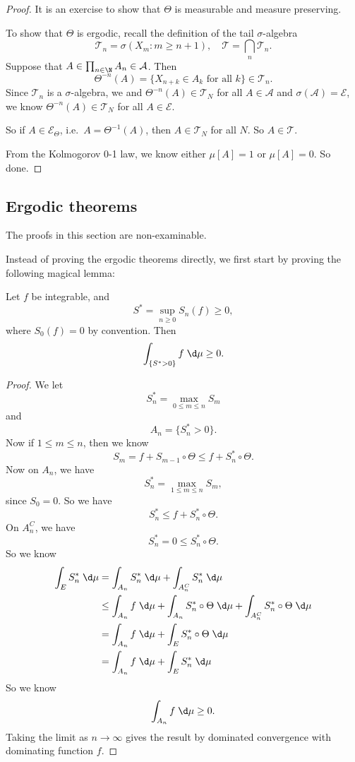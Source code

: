\documentclass[a4paper]{article}
\begin{document}
\begin{proof}
  It is an exercise to show that $\Theta$ is measurable and measure preserving.

  To show that $\Theta$ is ergodic, recall the definition of the tail $\sigma$-algebra
  \[
    \mathcal{T}_n = \sigma(X_m: m \geq n + 1),\quad \mathcal{T} = \bigcap_n \mathcal{T}_n.
  \]
  Suppose that $A \in \prod_{n \in \N} A_n \in \mathcal{A}$. Then
  \[
    \Theta^{-n}(A) = \{X_{n + k} \in A_k \text{ for all }k\} \in \mathcal{T}_n.
  \]
  Since $\mathcal{T}_n$ is a $\sigma$-algebra, we and $\Theta^{-n}(A) \in \mathcal{T}_N$ for all $A \in \mathcal{A}$ and $\sigma(\mathcal{A}) = \mathcal{E}$, we know $\Theta^{-n}(A) \in \mathcal{T}_N$ for all $A \in \mathcal{E}$.

  So if $A \in \mathcal{E}_\Theta$, i.e.\ $A = \Theta^{-1}(A)$, then $A \in \mathcal{T}_N$ for all $N$. So $A \in \mathcal{T}$.

  From the Kolmogorov 0-1 law, we know either $\mu[A] = 1$ or $\mu[A] = 0$. So done.
\end{proof}

\subsection{Ergodic theorems}
The proofs in this section are non-examinable.

Instead of proving the ergodic theorems directly, we first start by proving the following magical lemma:
\begin{lemma}
  Let $f$ be integrable, and
  \[
    S^* = \sup_{n \geq 0} S_n(f) \geq 0,
  \]
  where $S_0(f) = 0$ by convention. Then
  \[
    \int_{\{S^* > 0\}} f \;\d \mu \geq 0.
  \]
\end{lemma}

\begin{proof}
  We let
  \[
    S_n^* = \max_{0 \leq m \leq n} S_m
  \]
  and
  \[
    A_n = \{S_n^* > 0\}.
  \]
  Now if $1 \leq m \leq n$, then we know
  \[
    S_m = f + S_{m - 1} \circ \Theta \leq f + S_n^* \circ \Theta.
  \]
  Now on $A_n$, we have
  \[
    S_n^* = \max_{1 \leq m \leq n} S_m,
  \]
  since $S_0 = 0$. So we have
  \[
    S_n^* \leq f + S_n^* \circ \Theta.
  \]
  On $A_n^C$, we have
  \[
    S_n^* = 0 \leq S_n^* \circ \Theta.
  \]
  So we know
  \begin{align*}
    \int_E S_n^*\;\d \mu&= \int_{A_n} S_n^*\; \d \mu + \int_{A_n^C} S_n^* \;\d \mu\\
    &\leq \int_{A_n} f \;\d \mu + \int_{A_n} S_n^* \circ \Theta \;\d \mu + \int_{A_n^C} S_n^* \circ \Theta \;\d \mu\\
    &= \int_{A_n} f\;\d \mu + \int_E S_n^* \circ \Theta \;\d \mu\\
    &= \int_{A_n} f\;\d \mu + \int_E S_n^* \;\d \mu
  \end{align*}
  So we know
  \[
    \int_{A_n} f\;\d \mu \geq 0.
  \]
  Taking the limit as $n \to \infty$ gives the result by dominated convergence with dominating function $f$.
\end{proof}
\end{document}
